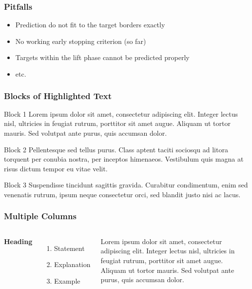 \documentclass{beamer}
\begin{document}
\begin{frame}
	\frametitle{Pitfalls}
	\begin{itemize}
		\item Prediction do not fit to the target borders exactly
		\item No working early stopping criterion (so far)
		\item Targets within the lift phase cannot be predicted properly
		\item etc.
	\end{itemize}
\end{frame}


\begin{frame}
\frametitle{Blocks of Highlighted Text}
\begin{block}{Block 1}
Lorem ipsum dolor sit amet, consectetur adipiscing elit. Integer lectus nisl, ultricies in feugiat rutrum, porttitor sit amet augue. Aliquam ut tortor mauris. Sed volutpat ante purus, quis accumsan dolor.
\end{block}

\begin{block}{Block 2}
Pellentesque sed tellus purus. Class aptent taciti sociosqu ad litora torquent per conubia nostra, per inceptos himenaeos. Vestibulum quis magna at risus dictum tempor eu vitae velit.
\end{block}

\begin{block}{Block 3}
Suspendisse tincidunt sagittis gravida. Curabitur condimentum, enim sed venenatis rutrum, ipsum neque consectetur orci, sed blandit justo nisi ac lacus.
\end{block}
\end{frame}


\begin{frame}
\frametitle{Multiple Columns}
\begin{columns}[c] %

\textbf{Heading}
\begin{enumerate}
\item Statement
\item Explanation
\item Example
\end{enumerate}

Lorem ipsum dolor sit amet, consectetur adipiscing elit. Integer lectus nisl, ultricies in feugiat rutrum, porttitor sit amet augue. Aliquam ut tortor mauris. Sed volutpat ante purus, quis accumsan dolor.

\end{columns}
\end{frame}
\end{document}
